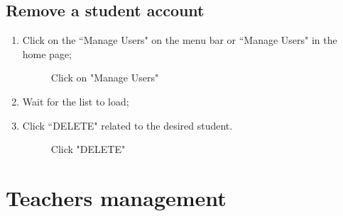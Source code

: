 \documentclass[ManualeUtente]{subfiles}
\begin{document}
\subsection{Remove a student account}
\begin{enumerate}
	\item Click on the \textquotedblleft Manage Users" on the menu bar or \textquotedblleft Manage Users" in the home page;
	\begin{figure}[H]
		\centering
		\caption{Click on "Manage Users"}
		\label{fig:Click on "Manage Users"}
	\end{figure}
	\item Wait for the list to load;
	\item Click \textquotedblleft DELETE" related to the desired student.
	\begin{figure}[H]
		\centering
		\caption{Click "DELETE"}
		\label{fig:Click "DELETE"}
	\end{figure}
\end{enumerate}

\section{Teachers management}
\end{document}
